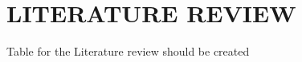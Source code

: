 \documentclass[main]{subfiles}
\begin{document}
\chapter{\MakeUppercase{LITERATURE REVIEW}}
Table for the Literature review should be created
\end{document}
